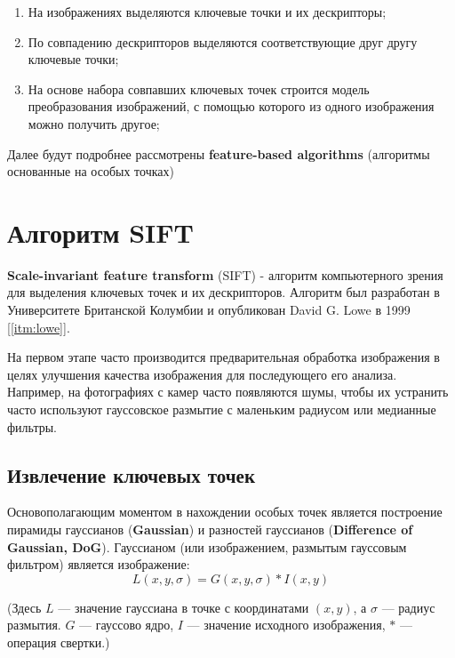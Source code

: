 \begin{enumerate}
    \item На изображениях выделяются ключевые точки и их дескрипторы;
    \item По совпадению дескрипторов выделяются соответствующие друг другу ключевые точки;
    \item На основе набора совпавших ключевых точек строится модель преобразования изображений, с помощью которого из одного изображения можно получить другое;
\end{enumerate}

Далее будут подробнее рассмотрены \textbf{feature-based algorithms} (алгоритмы основанные на особых точках)

\section{Алгоритм SIFT}   

\textbf{Scale-invariant feature transform} (SIFT) - алгоритм компьютерного зрения для выделения ключевых точек и их дескрипторов. Алгоритм был разработан в Университете Британской Колумбии и опубликован David G. Lowe в 1999 \hyperref[itm:lowe]{[\ref{itm:lowe}]}.
    
На первом этапе часто производится предварительная обработка изображения в целях улучшения качества изображения для последующего его анализа. Например, на фотографиях с камер часто появляются шумы, чтобы их устранить часто используют гауссовское размытие с маленьким радиусом или медианные фильтры.

\subsection{Извлечение ключевых точек}

Основополагающим моментом в нахождении особых точек является построение пирамиды гауссианов (\textbf{Gaussian}) и разностей гауссианов (\textbf{Difference of Gaussian, DoG}). Гауссианом (или изображением, размытым гауссовым фильтром) является изображение:
\begin{equation}
    L(x,y,\sigma) = G(x,y,\sigma) * I(x,y)
\end{equation} 

\begin{footnotesize}
(Здесь $L$ — значение гауссиана в точке с координатами $(x,y)$, а $\sigma$ — радиус размытия. $G$ — гауссово ядро, $I$ — значение исходного изображения, $*$ — операция свертки.)
\end{footnotesize}

